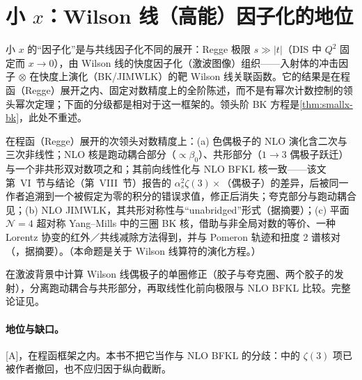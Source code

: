\section{小 $x$：Wilson 线（高能）因子化的地位}\label{sec:front-smallx}

小 $x$ 的“因子化”是与共线因子化不同的展开：Regge 极限 $s\gg|t|$（DIS 中 $Q^2$ 固定而 $x\to0$），由 Wilson 线的快度因子化（激波图像）组织——入射体的冲击因子 $\otimes$ 在快度上演化（BK/JIMWLK）的靶 Wilson 线关联函数。它的结果是在程函（Regge）展开之内、固定对数精度上的全阶陈述，而不是有幂次计数控制的领头幂次定理；下面的分级都是相对于这一框架的。领头阶 BK 方程是\cref{thm:smallx-bk}，此处不重述。

\begin{proposition}\label{prop:front-nlo-bk}
在程函（Regge）展开的次领头对数精度上：(a) 色偶极子的 NLO 演化含二次与三次非线性；NLO 核是跑动耦合部分（$\propto\beta_0$）、共形部分（$1\to3$ 偶极子跃迁）与一个非共形双对数项之和；其前向线性化与 NLO BFKL 核一致\cite{Balitsky:2007feb}——该文第~VI~节与结论（第~VIII~节）报告的 $\alpha_s^2\zeta(3)\times$（偶极子）的差异，后被同一作者追溯到一个被假定为零的积分的错误求值，修正后消失\cite[第~6~节，“In QCD”]{Balitsky:2009xg}；夸克部分与跑动耦合见\cite{Balitsky:2006wa,Kovchegov:2006vj}；(b) NLO JIMWLK\cite{Balitsky:2013fea,Kovner:2013ona}，其共形对称性\cite{Kovner:2014xia}与“unabridged”形式\cite{Kovner:2014lca}（据摘要）；(c) 平面 $\mathcal N=4$ 超对称 Yang--Mills 中的三圈 BK 核，借助与非全局对数的等价、一种 Lorentz 协变的红外／共线减除方法得到，并与 Pomeron 轨迹和扭度 2 谱核对（\cite{Caron-Huot:2016tzz}，据摘要）。（本命题是关于 Wilson 线算符的演化方程。）
\end{proposition}

\begin{proofsketch}
在激波背景中计算 Wilson 线偶极子的单圈修正（胶子与夸克圈、两个胶子的发射），分离跑动耦合与共形部分，再取线性化前向极限与 NLO BFKL 比较。完整论证见\cite{Balitsky:2007feb,Balitsky:2009xg}。
\end{proofsketch}

\paragraph{地位与缺口。}[A]，在程函框架之内。本书不把它当作与 NLO BFKL 的分歧：\cite{Balitsky:2007feb}中的 $\zeta(3)$ 项已被作者撤回\cite[第~6~节]{Balitsky:2009xg}，也不应归因于纵向截断。

